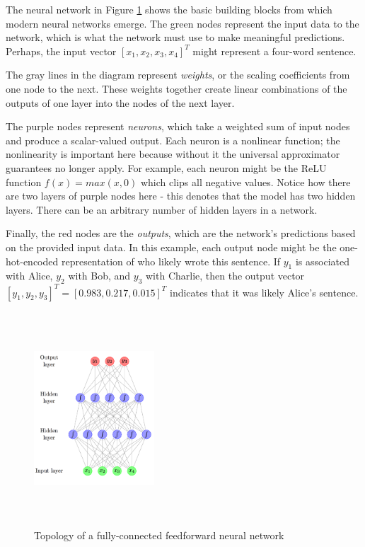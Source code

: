 \documentclass[12pt,letterpaper]{article}
\begin{document}
The neural network in Figure \ref{fig:feedforwardNN} shows the basic building blocks from which modern neural networks emerge. The green nodes represent the input data to the network, which is what the network must use to make meaningful predictions. Perhaps, the input vector $[x_1,x_2,x_3,x_4]^T$ might represent a four-word sentence.\par

The gray lines in the diagram represent \textit{weights}, or the scaling coefficients from one node to the next. These weights together create linear combinations of the outputs of one layer into the nodes of the next layer. \par 

The purple nodes represent \textit{neurons}, which take a weighted sum of input nodes and produce a scalar-valued output. Each neuron is a nonlinear function; the nonlinearity is important here because without it the universal approximator guarantees no longer apply. For example, each neuron might be the ReLU function $f(x)=max(x,0)$ which clips all negative values. Notice how there are two layers of purple nodes here - this denotes that the model has two hidden layers. There can be an arbitrary number of hidden layers in a network. \par 

Finally, the red nodes are the \textit{outputs}, which are the network's predictions based on the provided input data. In this example, each output node might be the one-hot-encoded representation of who likely wrote this sentence. If $y_1$ is associated with Alice, $y_2$ with Bob, and $y_3$ with Charlie, then the output vector $[y_1,y_2,y_3]^T = [0.983,0.217,0.015]^T$ indicates that it was likely Alice's sentence.

\begin{figure}[ht]
\centering
\includegraphics[width=0.4\textwidth,height=8cm]{neural_network_machinelearningmastery.png}
\captionsetup{width=0.7\linewidth}
\caption{ Topology of a fully-connected feedforward neural network \cite{feedforward_pic}}
\label{fig:feedforwardNN}
\end{figure}
\end{document}
